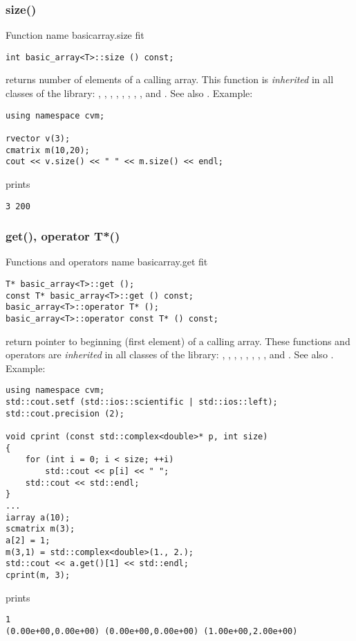 \subsubsection{size()}
Function%
\pdfdest name {basicarray.size} fit
\begin{verbatim}
int basic_array<T>::size () const;
\end{verbatim}
returns  number of elements of a calling array.
This function is \emph{inherited} in all classes of the library:
,   ,
,   ,
, ,
, ,
 and .
See also .
Example:
\begin{Verbatim}
using namespace cvm;

rvector v(3);
cmatrix m(10,20);
cout << v.size() << " " << m.size() << endl;
\end{Verbatim}
prints
\begin{Verbatim}
3 200
\end{Verbatim}
\newpage


\subsubsection{get(), operator T*()}
Functions and operators%
\pdfdest name {basicarray.get} fit
\begin{verbatim}
T* basic_array<T>::get ();
const T* basic_array<T>::get () const;
basic_array<T>::operator T* ();
basic_array<T>::operator const T* () const;
\end{verbatim}
return  pointer to beginning (first element) of a calling array.
These functions and operators are \emph{inherited} in all 
classes of the library:
,   ,
,   ,
, ,
, ,
 and .
See also .
Example:
\begin{Verbatim}
using namespace cvm;
std::cout.setf (std::ios::scientific | std::ios::left); 
std::cout.precision (2);

void cprint (const std::complex<double>* p, int size)
{
    for (int i = 0; i < size; ++i)
        std::cout << p[i] << " ";
    std::cout << std::endl;
}
...
iarray a(10);
scmatrix m(3);
a[2] = 1;
m(3,1) = std::complex<double>(1., 2.);
std::cout << a.get()[1] << std::endl;
cprint(m, 3);
\end{Verbatim}
prints
\begin{Verbatim}
1
(0.00e+00,0.00e+00) (0.00e+00,0.00e+00) (1.00e+00,2.00e+00)
\end{Verbatim}
\newpage



